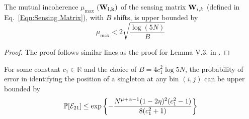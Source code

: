 \begin{lemma}[Mutual Incoherence Bound for sub-sampled IDFT matrix  [\cite{pawar2014robust},Proposition~A.1]
\label{lemma:MutualCoherence}
	The mutual incoherence $\mu_{\text{max}}$ $(\mathbf{W_{i,k}})$ of the sensing matrix $\mathbf{W}_{i,k}$ (defined in Eq.~\ref{Eqn:Sensing Matrix}), with $B$ shifts, is upper bounded by
	\[ \mu_{\text{max}} < 2\sqrt{\frac{\log(5N)}{B}} \] 
	
\end{lemma}
\begin{proof}
	The proof follows similar lines as the proof for Lemma V.3. in \cite{pawar2014robust}.
\end{proof}
 
\begin{lemma} \label{Lem:Pos1}
For some constant $c_1 \in \mathbb{R}$ and the choice of $B=4c_1^2\log 5N$,  the probability of error in identifying the position of a singleton at any bin $(i,j)$ can be upper bounded by
\begin{align*}
\mathbb{P}[\mathcal{E}_{21}]\leq \exp\left\lbrace-\frac{N^{\mu+\alpha-1}(1-2\eta)^2(c_1^2-1)}{8(c_1^2+1)}\right\rbrace
\end{align*}
\end{lemma}
%	
